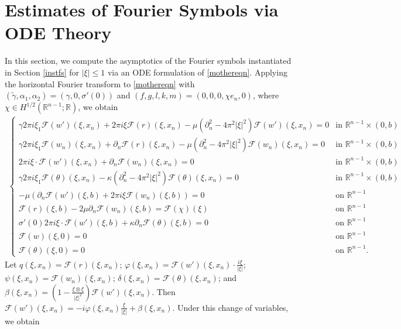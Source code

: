 \documentclass[11pt,letterpaper,reqno]{amsart}
\numberwithin{equation}{section}
\newcommand{\abs}[1]{\left\lvert#1\right\rvert}
\begin{document}
\section{Estimates of Fourier Symbols via ODE Theory} \label{odetheory}
In this section, we compute the asymptotics of the Fourier symbols instantiated in Section \ref{instfs} for \(\abs{\xi} \leq 1\) via an ODE formulation of \eqref{mothereqn}. Applying the horizontal Fourier transform to \eqref{mothereqn} with \((\widetilde{\gamma},\alpha_{1},\alpha_{2})=(\gamma,0,\sigma'(0))\) and \((f,g,l,k,m)=(0,0,0,\chi e_{n},0)\), where \(\chi \in H^{1/2}(\mathbb{R}^{n-1};\mathbb{R})\), we obtain
\begin{align} \label{hftlinsys}
    \begin{cases}
        \gamma 2\pi i \xi_{1}\mathcal{F}(w')(\xi,x_{n})+2\pi i \xi\mathcal{F}(r)(\xi,x_{n}) -\mu(\partial_{n}^{2}-4\pi^{2}\abs{\xi}^{2})\mathcal{F}(w')(\xi,x_{n})=0 &\mbox{in \(\mathbb{R}^{n-1} \times (0,b)\)} \\
        \gamma 2\pi i \xi_{1}\mathcal{F}(w_{n})(\xi,x_{n})+\partial_{n}\mathcal{F}(r)(\xi,x_{n}) -\mu(\partial_{n}^{2}-4\pi^{2}\abs{\xi}^{2})\mathcal{F}(w_{n})(\xi,x_{n})=0 &\mbox{in \(\mathbb{R}^{n-1} \times (0,b)\)} \\
        2\pi i \xi \cdot \mathcal{F}(w')(\xi,x_{n})+\partial_{n}\mathcal{F}(w_{n})(\xi,x_{n})=0 &\mbox{in \(\mathbb{R}^{n-1} \times (0,b)\)} \\
        \gamma 2\pi i \xi_{1}\mathcal{F}(\theta)(\xi,x_{n})-\kappa(\partial_{n}^{2}-4\pi^{2}\abs{\xi}^{2})\mathcal{F}(\theta)(\xi,x_{n}) =0 &\mbox{in \(\mathbb{R}^{n-1} \times (0,b)\)} \\
        -\mu(\partial_{n}\mathcal{F}(w')(\xi,b)+2\pi i \xi\mathcal{F}(w_{n})(\xi,b))=0 &\mbox{on \(\mathbb{R}^{n-1}\)} \\
        \mathcal{F}(r)(\xi,b)-2\mu\partial_{n}\mathcal{F}(w_{n})(\xi,b)=\mathcal{F}(\chi)(\xi) &\mbox{on \(\mathbb{R}^{n-1}\)} \\
        \sigma'(0)2\pi i \xi \cdot \mathcal{F}(w')(\xi,b)+\kappa\partial_{n}\mathcal{F}(\theta)(\xi,b) = 0 &\mbox{on \(\mathbb{R}^{n-1}\)} \\
        \mathcal{F}(w)(\xi,0)=0 &\mbox{on \(\mathbb{R}^{n-1}\)} \\
        \mathcal{F}(\theta)(\xi,0) = 0 &\mbox{on \(\mathbb{R}^{n-1}\)}.        
    \end{cases}
\end{align}
Let \(q(\xi,x_{n})=\mathcal{F}(r)(\xi,x_{n})\); \(\varphi(\xi,x_{n}) = \mathcal{F}(w')(\xi,x_{n}) \cdot \frac{i\xi}{\abs{\xi}}\); \(\psi(\xi,x_{n}) = \mathcal{F}(w_{n})(\xi,x_{n})\); \(\delta(\xi,x_{n})=\mathcal{F}(\theta)(\xi,x_{n})\); and \(\beta(\xi,x_{n}) = (1-\frac{\xi \otimes \xi}{\abs{\xi}^{2}})\mathcal{F}(w')(\xi,x_{n})\). Then \(\mathcal{F}(w')(\xi,x_{n})=-i\varphi(\xi,x_{n})\frac{\xi}{\abs{\xi}}+\beta(\xi,x_{n})\). Under this change of variables, we obtain
\end{document}
